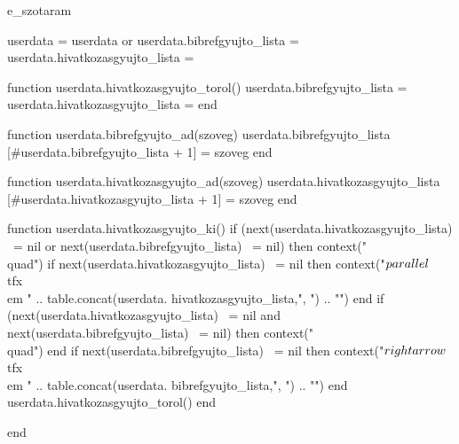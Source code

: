 \startenvironment e_szotaram

\startluacode

  userdata = userdata or {}
  userdata.bibrefgyujto_lista = {}
  userdata.hivatkozasgyujto_lista = {}

  function userdata.hivatkozasgyujto_torol()
    userdata.bibrefgyujto_lista = {}
    userdata.hivatkozasgyujto_lista = {}
  end

  function userdata.bibrefgyujto_ad(szoveg)
    userdata.bibrefgyujto_lista [#userdata.bibrefgyujto_lista + 1] = szoveg
  end

  function userdata.hivatkozasgyujto_ad(szoveg)
    userdata.hivatkozasgyujto_lista [#userdata.hivatkozasgyujto_lista + 1] = szoveg
  end

  function userdata.hivatkozasgyujto_ki()
    if (next(userdata.hivatkozasgyujto_lista) ~= nil or next(userdata.bibrefgyujto_lista) ~= nil) then
      context("\\quad")
      if next(userdata.hivatkozasgyujto_lista) ~= nil then
        context("$\\parallel$~{\\tfx\\em " .. table.concat(userdata.  hivatkozasgyujto_lista,", ") .. "}")
      end
      if (next(userdata.hivatkozasgyujto_lista) ~= nil and next(userdata.bibrefgyujto_lista) ~= nil) then
        context("\\quad")
      end
      if next(userdata.bibrefgyujto_lista) ~= nil then
        context("$\\rightarrow$~{\\tfx\\em " .. table.concat(userdata.  bibrefgyujto_lista,", ") .. "}")
      end
      userdata.hivatkozasgyujto_torol()
    end

  end

\stopluacode





\def\Szotextcommand#1{\hbox{#1\enspace\bullet\enspace}}


